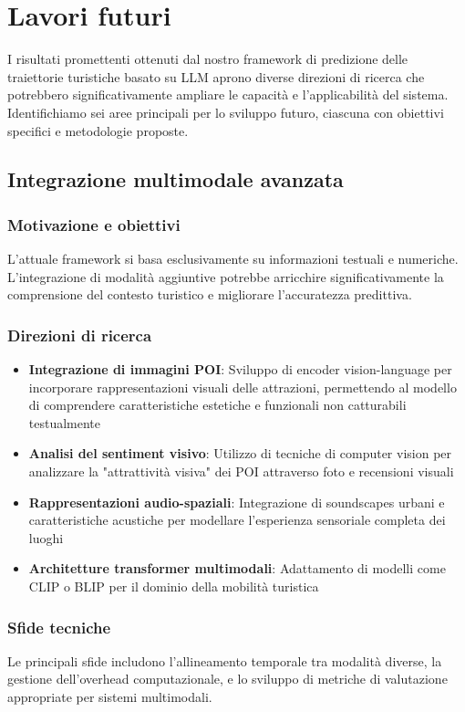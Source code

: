 \section{Lavori futuri}

I risultati promettenti ottenuti dal nostro framework di predizione delle traiettorie turistiche basato su LLM aprono diverse direzioni di ricerca che potrebbero significativamente ampliare le capacità e l'applicabilità del sistema. Identifichiamo sei aree principali per lo sviluppo futuro, ciascuna con obiettivi specifici e metodologie proposte.

\subsection{Integrazione multimodale avanzata}

\subsubsection{Motivazione e obiettivi}
L'attuale framework si basa esclusivamente su informazioni testuali e numeriche. L'integrazione di modalità aggiuntive potrebbe arricchire significativamente la comprensione del contesto turistico e migliorare l'accuratezza predittiva.

\subsubsection{Direzioni di ricerca}
\begin{itemize}
\item \textbf{Integrazione di immagini POI}: Sviluppo di encoder vision-language per incorporare rappresentazioni visuali delle attrazioni, permettendo al modello di comprendere caratteristiche estetiche e funzionali non catturabili testualmente
\item \textbf{Analisi del sentiment visivo}: Utilizzo di tecniche di computer vision per analizzare la "attrattività visiva" dei POI attraverso foto e recensioni visuali
\item \textbf{Rappresentazioni audio-spaziali}: Integrazione di soundscapes urbani e caratteristiche acustiche per modellare l'esperienza sensoriale completa dei luoghi
\item \textbf{Architetture transformer multimodali}: Adattamento di modelli come CLIP o BLIP per il dominio della mobilità turistica
\end{itemize}

\subsubsection{Sfide tecniche}
Le principali sfide includono l'allineamento temporale tra modalità diverse, la gestione dell'overhead computazionale, e lo sviluppo di metriche di valutazione appropriate per sistemi multimodali.

